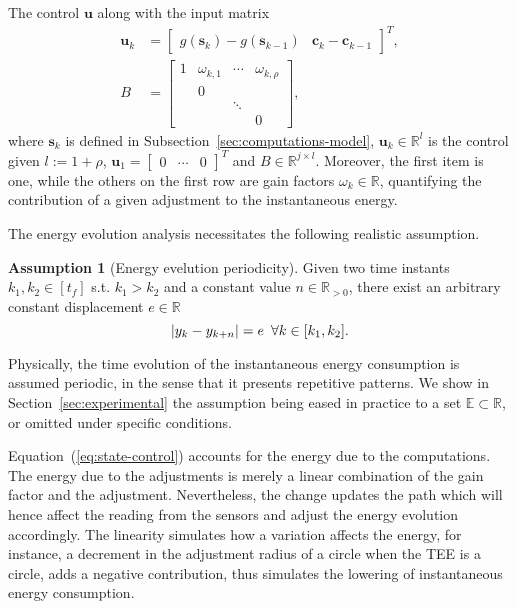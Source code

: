 \documentclass[letterpaper,10pt,conference]{ieeeconf}
\DeclarePairedDelimiter\abs{\lvert}{\rvert}%
\theoremstyle{definition}
\newtheorem{assm}[thm]{Assumption}
\begin{document}
The control $\mathbf{u}$ along with the input matrix
\begin{equation}\label{eq:state-control}\begin{split}  
  \mathbf{u}_k&=\begin{bmatrix}g(\mathbf{s}_k)-g(\mathbf{s}_{k-1}) & \mathbf{c}_k-\mathbf{c}_{k-1}\end{bmatrix}^T,\\
  B&=\left[\begin{array}{cccc}
    1& \omega_{k,1}& \cdots& \omega_{k,\rho}  \\
     &            0&       &  \\
     &             & \ddots&  \\
     &             &       & 0
  \end{array}\right],
\end{split}\end{equation}
where $\mathbf{s}_k$ is defined in Subsection~\ref{sec:computations-model}, $\mathbf{u}_k\in\mathbb{R}^l$ is the control given $l:=1+\rho$, $\mathbf{u}_{1}=\begin{bmatrix}0 & \cdots & 0\end{bmatrix}^T$ and $B\in\mathbb{R}^{j\times l}$. Moreover, the first item is one, while the others on the first row are gain factors $\omega_{k}\in\mathbb{R}$, quantifying the contribution of a given adjustment to the instantaneous energy. 

The energy evolution analysis necessitates the following realistic assumption.
\begin{assm}[Energy evelution periodicity]\label{assm:periodic} 
Given two time instants $k_1,k_2\in[t_f]$ s.t. $k_1>k_2$ and a constant value $n\in\mathbb{R}_{> 0}$, there exist an arbitrary constant displacement $e\in\mathbb{R}$
\begin{equation}
  \abs{y_{k}-y_{k+n}}= e\,\,\,\forall k\in[k_1,k_2].
\end{equation}
\end{assm}

Physically, the time evolution of the instantaneous energy consumption is assumed periodic, in the sense that it presents repetitive patterns. We show in Section~\ref{sec:experimental} the assumption being eased in practice to a set $\mathbb{E}\subset\mathbb{R}$, or omitted under specific conditions.

Equation~(\ref{eq:state-control}) accounts for the energy due to the computations. The energy due to the adjustments is merely a linear combination of the gain factor and the adjustment. Nevertheless, the change updates the path which will hence affect the reading from the sensors and adjust the energy evolution accordingly. The linearity simulates how a variation affects the energy, for instance, a decrement in the adjustment radius of a circle when the TEE is a circle, adds a negative contribution, thus simulates the lowering of instantaneous energy consumption.
\end{document}
